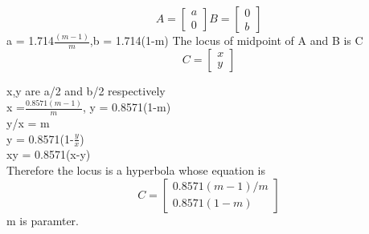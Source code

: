 \documentclass[12pt]{article}
\begin{document}
\[
A = 
\begin{bmatrix}
 a \\
 0
\end{bmatrix}
B = 
\begin{bmatrix}
 0 \\
 b
\end{bmatrix}
\]
a = 1.714$\frac{(m-1)}{m}$,b = 1.714(1-m)
The locus of midpoint of A and B is C
\[
C = 
\begin{bmatrix}
 x \\
 y
\end{bmatrix}
\]
\begin{center}
x,y are a/2 and b/2 respectively\\
\singlespacing
x =$\frac{0.8571(m-1)}{m}$, y = 0.8571(1-m)\\
\singlespacing
y/x = m\\
\singlespacing
y = 0.8571(1-$\frac{y}{x}$)\\
\singlespacing
xy = 0.8571(x-y)\\
\singlespacing
Therefore the locus is a hyperbola whose equation is
\[
C = 
\begin{bmatrix}
  0.8571(m-1)/m \\
  0.8571(1-m)
\end{bmatrix}
\]
m is paramter.


\end{center}
\end{document}
